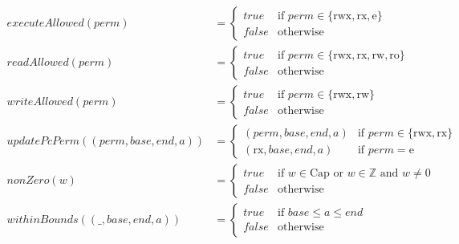 \documentclass{article}
\newcommand{\false}{\mathit{false}}
\newcommand{\true}{\mathit{true}}
\newcommand{\var}[1]{\mathit{#1}}
\newcommand{\addr}{\var{a}}
\newcommand{\start}{\var{base}}
\newcommand{\addrend}{\var{end}}
\newcommand{\perm}{\var{perm}}
\newcommand{\plainfun}[1]{\mathit{#1}}
\newcommand{\updatePcPerm}[1]{\plainfun{updatePcPerm}(#1)}
\newcommand{\executeAllowed}[1]{\plainfun{executeAllowed}(#1)}
\newcommand{\nonZero}[1]{\plainfun{nonZero}(#1)}
\newcommand{\readAllowed}[1]{\plainfun{readAllowed}(#1)}
\newcommand{\writeAllowed}[1]{\plainfun{writeAllowed}(#1)}
\newcommand{\withinBounds}[1]{\plainfun{withinBounds}(#1)}
\newcommand{\plaindom}[1]{\mathrm{#1}}
\newcommand{\Caps}{\plaindom{Cap}}
\newcommand{\ints}{\mathbb{Z}}
\newcommand{\plainperm}[1]{\mathrm{#1}}
\newcommand{\readonly}{\plainperm{ro}}
\newcommand{\readwrite}{\plainperm{rw}}
\newcommand{\exec}{\plainperm{rx}}
\newcommand{\entry}{\plainperm{e}}
\newcommand{\rwx}{\plainperm{rwx}}
\begin{document}
\begin{align*}
  \executeAllowed{\perm} &=
                           \begin{cases}
                             \true & \text{if } \perm \in \{ \rwx, \exec, \entry \} \\
                             \false & \text{otherwise}
                           \end{cases} \\
  \readAllowed{\perm} &=
                           \begin{cases}
                             \true & \text{if } \perm \in \{ \rwx, \exec, \readwrite, \readonly \} \\
                             \false & \text{otherwise}
                           \end{cases} \\
  \writeAllowed{\perm} &=
                           \begin{cases}
                             \true & \text{if } \perm \in \{ \rwx, \readwrite\} \\
                             \false & \text{otherwise}
                           \end{cases} \\
  \updatePcPerm{(\perm,\start,\addrend,\addr)} &=
                                     \begin{cases}
                                       (\perm,\start,\addrend,\addr) & \text{if $\perm\in\{ \rwx, \exec \}$} \\
                                       (\exec,\start,\addrend,\addr) & \text{if $\perm = \entry$}
                                     \end{cases} \\
  \nonZero{w} &=
                \begin{cases}
                  \true & \text{if $w\in \Caps$ or $w\in \ints$ and $w \neq 0$}\\
                  \false & \text{otherwise}
                \end{cases} \\
  \withinBounds{(\_,\start,\addrend,\addr)} &=
                                              \begin{cases}
                                                \true  & \text{if $\start \leq \addr \leq \addrend$} \\
                                                \false & \text{otherwise}
                                              \end{cases} \\

\end{align*}
\end{document}
